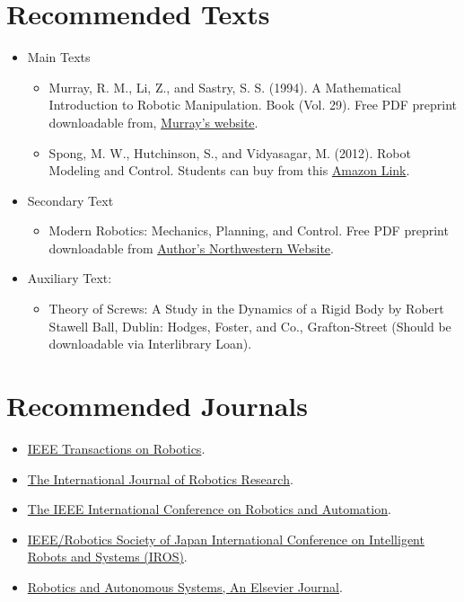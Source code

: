 \section{Recommended Texts}
\begin{itemize}
	\item  	Main Texts
	\begin{itemize}
		\item Murray, R. M., Li, Z., and Sastry, S. S. (1994). A Mathematical Introduction to Robotic Manipulation. Book (Vol. 29). Free PDF preprint downloadable from, \href{https://www.cds.caltech.edu/~murray/books/MLS/pdf/mls94-complete.pdf }{Murray's website}.
		\item 	Spong, M. W., Hutchinson, S., and Vidyasagar, M. (2012). Robot Modeling and Control. Students can buy from this \href{https://www.amazon.com/Robot-Modeling-Control-Mark-Spong/dp/0471649902}{Amazon Link}.
	\end{itemize} 
	\item Secondary Text
	\begin{itemize}
		\item Modern Robotics: Mechanics, Planning, and Control. Free PDF preprint downloadable from \href{ http://hades.mech.northwestern.edu/images/7/7f/MR.pdf}{Author's Northwestern Website}.		
	\end{itemize} 
    \item 
    Auxiliary Text: 
    \begin{itemize}
    	\item Theory of Screws: A Study in the Dynamics of a Rigid Body by Robert Stawell Ball, Dublin: Hodges, Foster, and Co., Grafton-Street (Should be downloadable via Interlibrary Loan).
    \end{itemize}
\end{itemize}

\section{Recommended Journals}
	\begin{itemize}
		\item 
		\href{ https://ieeexplore.ieee.org/xpl/RecentIssue.jsp?punumber=8860}{IEEE Transactions on Robotics}.
		\item 
		\href{https://journals.sagepub.com/home/ijr}{The International Journal of Robotics Research}.
		\item 
		\href{https://www.ieee-ras.org/conferences-workshops/fully-sponsored/icra}{The IEEE International Conference on Robotics and Automation}.
		\item \href{https://www.ieee-ras.org/conferences-workshops/financially-co-sponsored/iros}{IEEE/Robotics Society of Japan International Conference on Intelligent Robots and Systems (IROS)}.
		\item \href{https://www.journals.elsevier.com/robotics-and-autonomous-systems}{Robotics and Autonomous Systems, An Elsevier Journal}.
	\end{itemize}

